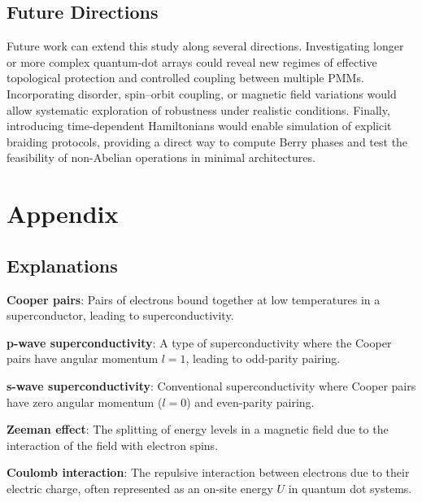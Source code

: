 \documentclass[11pt, letterpaper, titlepage]{article}
\begin{document}
\subsection{Future Directions}
Future work can extend this study along several directions. Investigating longer or more complex quantum-dot arrays could reveal new regimes of effective topological protection and controlled coupling between multiple PMMs. Incorporating disorder, spin–orbit coupling, or magnetic field variations would allow systematic exploration of robustness under realistic conditions. Finally, introducing time-dependent Hamiltonians would enable simulation of explicit braiding protocols, providing a direct way to compute Berry phases and test the feasibility of non-Abelian operations in minimal architectures.


\newpage
\section{Appendix}
\subsection{Explanations}

\textbf{Cooper pairs}: Pairs of electrons bound together at low temperatures in a superconductor, leading to superconductivity.

\textbf{p-wave superconductivity}: A type of superconductivity where the Cooper pairs have angular momentum \(l=1\), leading to odd-parity pairing.  

\textbf{s-wave superconductivity}: Conventional superconductivity where Cooper pairs have zero angular momentum (\(l=0\)) and even-parity pairing.  

\textbf{Zeeman effect}: The splitting of energy levels in a magnetic field due to the interaction of the field with electron spins.  

\textbf{Coulomb interaction}: The repulsive interaction between electrons due to their electric charge, often represented as an on-site energy \(U\) in quantum dot systems.

\printbibliography
\end{document}
